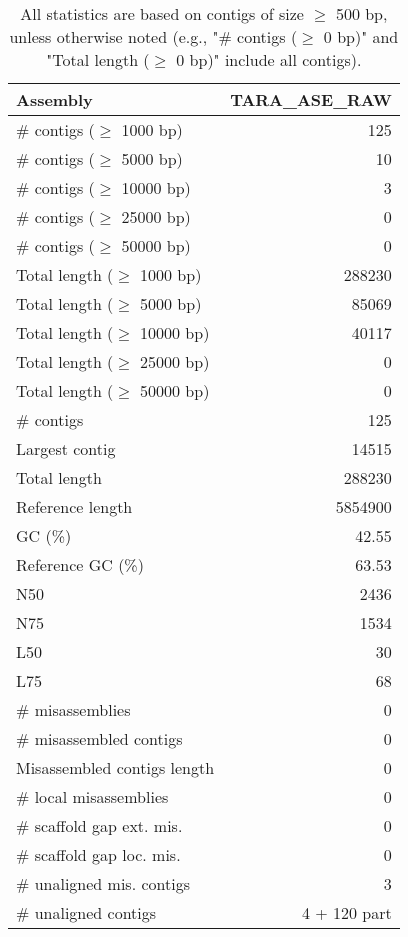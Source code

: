 \documentclass[12pt,a4paper]{article}
\begin{document}
\begin{table}[ht]
\begin{center}
\caption{All statistics are based on contigs of size $\geq$ 500 bp, unless otherwise noted (e.g., "\# contigs ($\geq$ 0 bp)" and "Total length ($\geq$ 0 bp)" include all contigs).}
\begin{tabular}{|l*{1}{|r}|}
\hline
Assembly & TARA\_ASE\_RAW \\ \hline
\# contigs ($\geq$ 1000 bp) & 125 \\ \hline
\# contigs ($\geq$ 5000 bp) & 10 \\ \hline
\# contigs ($\geq$ 10000 bp) & 3 \\ \hline
\# contigs ($\geq$ 25000 bp) & 0 \\ \hline
\# contigs ($\geq$ 50000 bp) & 0 \\ \hline
Total length ($\geq$ 1000 bp) & 288230 \\ \hline
Total length ($\geq$ 5000 bp) & 85069 \\ \hline
Total length ($\geq$ 10000 bp) & 40117 \\ \hline
Total length ($\geq$ 25000 bp) & 0 \\ \hline
Total length ($\geq$ 50000 bp) & 0 \\ \hline
\# contigs & 125 \\ \hline
Largest contig & 14515 \\ \hline
Total length & 288230 \\ \hline
Reference length & 5854900 \\ \hline
GC (\%) & 42.55 \\ \hline
Reference GC (\%) & 63.53 \\ \hline
N50 & 2436 \\ \hline
N75 & 1534 \\ \hline
L50 & 30 \\ \hline
L75 & 68 \\ \hline
\# misassemblies & 0 \\ \hline
\# misassembled contigs & 0 \\ \hline
Misassembled contigs length & 0 \\ \hline
\# local misassemblies & 0 \\ \hline
\# scaffold gap ext. mis. & 0 \\ \hline
\# scaffold gap loc. mis. & 0 \\ \hline
\# unaligned mis. contigs & 3 \\ \hline
\# unaligned contigs & 4 + 120 part \\ \hline

\end{tabular}
\end{center}
\end{table}
\end{document}
